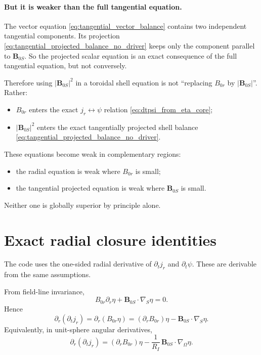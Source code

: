 \documentclass[11pt,a4paper]{article}
\begin{document}
\paragraph{But it is weaker than the full tangential equation.}
The vector equation \eqref{eq:tangential_vector_balance} contains two
independent tangential components. Its projection
\eqref{eq:tangential_projected_balance_no_driver} keeps only the component
parallel to $\mathbf B_{0S}$. So the projected scalar equation is an exact
consequence of the full tangential equation, but not conversely.

Therefore using $|\mathbf B_{0S}|^2$ in a toroidal shell equation is not
``replacing $B_{0r}$ by $|\mathbf B_{0S}|$''. Rather:
\begin{itemize}
\item $B_{0r}$ enters the exact $j_r \leftrightarrow \psi$ relation
\eqref{eq:dtpsi_from_eta_core};
\item $|\mathbf B_{0S}|^2$ enters the exact tangentially projected shell
balance \eqref{eq:tangential_projected_balance_no_driver}.
\end{itemize}

These equations become weak in complementary regions:
\begin{itemize}
\item the radial equation is weak where $B_{0r}$ is small;
\item the tangential projected equation is weak where $\mathbf B_{0S}$ is small.
\end{itemize}
Neither one is globally superior by principle alone.

\section{Exact radial closure identities}

The code uses the one-sided radial derivative of $\partial_t j_r$ and
$\partial_t\psi$. These are derivable from the same assumptions.

From field-line invariance,
\[
B_{0r}\partial_r \eta + \mathbf B_{0S}\cdot \nabla_S \eta = 0.
\]
Hence
\begin{equation}
\partial_r(\partial_t j_r)
=
\partial_r(B_{0r}\eta)
=
(\partial_r B_{0r})\eta - \mathbf B_{0S}\cdot \nabla_S \eta.
\label{eq:dr_dtjr}
\end{equation}
Equivalently, in unit-sphere angular derivatives,
\begin{equation}
\partial_r(\partial_t j_r)
=
(\partial_r B_{0r})\eta
-\frac{1}{R_I}\,\mathbf B_{0S}\cdot \nabla_\Omega \eta.
\label{eq:dr_dtjr_unit_sphere}
\end{equation}
\end{document}
